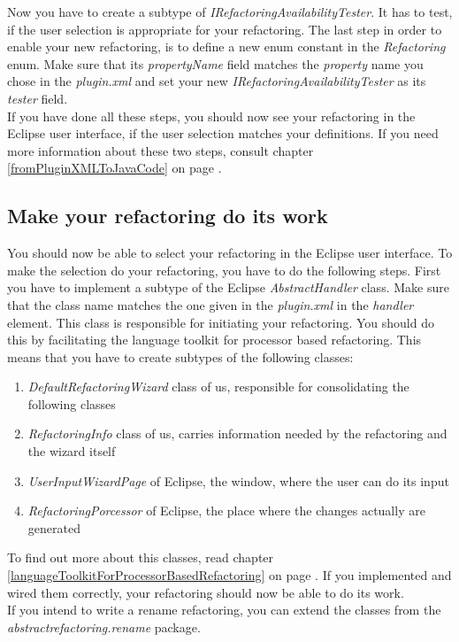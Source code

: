 \documentclass[a4paper,10pt]{report}
\begin{document}
Now you have to create a subtype of {\it IRefactoringAvailabilityTester}. It has to test, if the user selection is appropriate for your refactoring.
The last step in order to enable your new refactoring, is to define a new enum constant in the {\it Refactoring} enum.
Make sure that its {\it propertyName} field matches the {\it property} name you chose in the {\it plugin.xml} and set your new {\it IRefactoringAvailabilityTester} as its {\it tester} field.\\
If you have done all these steps, you should now see your refactoring in the Eclipse user interface, if the user selection matches your definitions.
If you need more information about these two steps, consult chapter \ref{fromPluginXMLToJavaCode} on page \pageref{fromPluginXMLToJavaCode}.

\subsection{Make your refactoring do its work}
You should now be able to select your refactoring in the Eclipse user interface.
To make the selection do your refactoring, you have to do the following steps.
First you have to implement a subtype of the Eclipse {\it AbstractHandler} class.
Make sure that the class name matches the one given in the {\it plugin.xml} in the {\it handler} element.
This class is responsible for initiating your refactoring. You should do this by facilitating the language toolkit for processor based refactoring.
This means that you have to create subtypes of the following classes:
   \begin{enumerate}
    \item {\it DefaultRefactoringWizard} class of us, responsible for consolidating the following classes
    \item {\it RefactoringInfo} class of us, carries information needed by the refactoring and the wizard itself
    \item {\it UserInputWizardPage} of Eclipse, the window, where the user can do its input
    \item {\it RefactoringPorcessor} of Eclipse, the place where the changes actually are generated
   \end{enumerate}
To find out more about this classes, read chapter \ref{languageToolkitForProcessorBasedRefactoring} on page \pageref{languageToolkitForProcessorBasedRefactoring}.
If you implemented and wired them correctly, your refactoring should now be able to do its work.\\
If you intend to write a rename refactoring, you can extend the classes from the {\it abstractrefactoring.rename} package.
\end{document}
